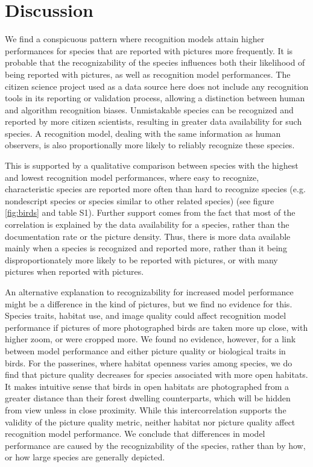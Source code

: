 \documentclass{article}
\begin{document}
\section*{Discussion}
We find a conspicuous pattern where recognition models attain higher performances for species that are reported with pictures more frequently. It is probable that the recognizability of the species influences both their likelihood of being reported with pictures, as well as recognition model performances. The citizen science project used as a data source here does not include any recognition tools in its reporting or validation process, allowing a distinction between human and algorithm recognition biases. Unmistakable species can be recognized and reported by more citizen scientists, resulting in greater data availability for such species. A recognition model, dealing with the same information as human observers, is also proportionally more likely to reliably recognize these species.

This is supported by a qualitative comparison between species with the highest and lowest recognition model performances, where easy to recognize, characteristic species are reported more often than hard to recognize species (e.g. nondescript species or species similar to other related species) (see figure \ref{fig:birds} and table S1). Further support comes from the fact that most of the correlation is explained by the data availability for a species, rather than the documentation rate or the picture density. Thus, there is more data available mainly when a species is recognized and reported more, rather than it being disproportionately more likely to be reported with pictures, or with many pictures when reported with pictures.

An alternative explanation to recognizability for increased model performance might be a difference in the kind of pictures, but we find no evidence for this. Species traits, habitat use, and image quality could affect recognition model performance if pictures of more photographed birds are taken more up close, with higher zoom, or were cropped more. We found no evidence, however, for a link between model performance and either picture quality or biological traits in birds. For the passerines, where habitat openness varies among species, we do find that picture quality decreases for species associated with more open habitats. It makes intuitive sense that birds in open habitats are photographed from a greater distance than their forest dwelling counterparts, which will be hidden from view unless in close proximity. While this intercorrelation supports the validity of the picture quality metric, neither habitat nor picture quality affect recognition model performance. We conclude that differences in model performance are caused by the recognizability of the species, rather than by how, or how large species are generally depicted.
\end{document}
